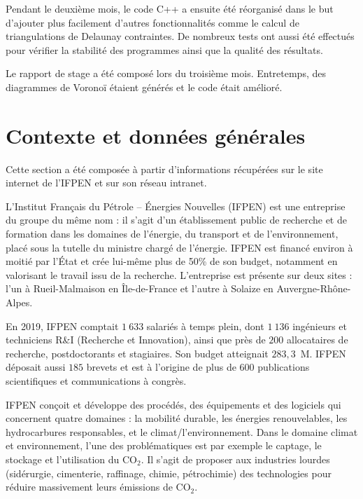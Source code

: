 \documentclass[12pt,a4paper]{report}
\begin{document}
Pendant le deuxième mois, le code C++ a ensuite été réorganisé dans le but d'ajouter plus facilement d'autres fonctionnalités comme le calcul de triangulations de Delaunay contraintes. De nombreux tests ont aussi été effectués pour vérifier la stabilité des programmes ainsi que la qualité des résultats.

Le rapport de stage a été composé lors du troisième mois. Entretemps, des diagrammes de Voronoï étaient générés et le code était amélioré.


\newpage
\section{Contexte et données générales}
Cette section a été composée à partir d'informations récupérées sur le site internet de l'IFPEN et sur son réseau intranet.
\vspace{1cm}

L'Institut Français du Pétrole -- \'Energies Nouvelles (IFPEN) est une entreprise du groupe du même nom : il s'agit d'un établissement public de recherche et de formation dans les domaines de l'énergie, du transport et de l'environnement, placé sous la tutelle du ministre chargé de l'énergie. IFPEN est financé environ à moitié par l'\'Etat et crée lui-même plus de 50\% de son budget, notamment en valorisant le travail issu de la recherche. L'entreprise est présente sur deux sites : l'un à Rueil-Malmaison en \^Ile-de-France et l'autre à Solaize en Auvergne-Rhône-Alpes.

En 2019, IFPEN comptait $1\ 633$ salariés à temps plein, dont $1\ 136$ ingénieurs et techniciens R\&I (Recherche et Innovation), ainsi que près de $200$ allocataires de recherche, postdoctorants et stagiaires. Son budget atteignait $283,3$~\textrm{M}\texteuro. IFPEN déposait aussi $185$ brevets et est à l'origine de plus de $600$ publications scientifiques et communications à congrès.

IFPEN conçoit et développe des procédés, des équipements et des logiciels qui concernent quatre domaines : la mobilité durable, les énergies renouvelables, les hydrocarbures responsables, et le climat/l'environnement. Dans le domaine climat et environnement, l'une des problématiques est par exemple le captage, le stockage et l'utilisation du CO$_2$. Il s'agit de proposer aux industries lourdes (sidérurgie, cimenterie, raffinage, chimie, pétrochimie) des technologies pour réduire massivement leurs émissions de CO$_2$.
\end{document}
